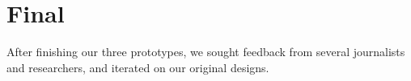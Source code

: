 \section{Final}
After finishing our three prototypes, we sought feedback from several journalists and researchers, and iterated on our original designs. 
